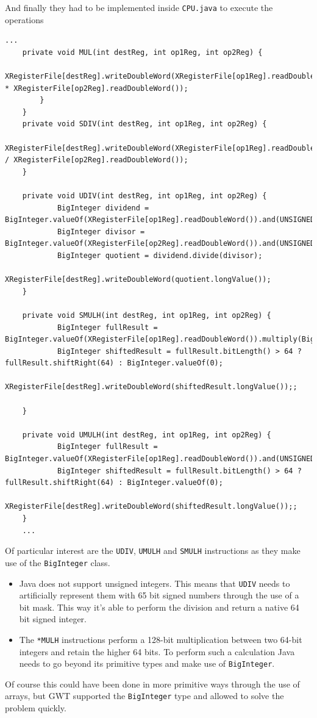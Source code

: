 And finally they had to be implemented inside \verb|CPU.java| to execute the operations
\begin{lstlisting}[caption={}]
	...
	private void MUL(int destReg, int op1Reg, int op2Reg) {											
			XRegisterFile[destReg].writeDoubleWord(XRegisterFile[op1Reg].readDoubleWord() * XRegisterFile[op2Reg].readDoubleWord());
		}
	}
	private void SDIV(int destReg, int op1Reg, int op2Reg) {
			XRegisterFile[destReg].writeDoubleWord(XRegisterFile[op1Reg].readDoubleWord() / XRegisterFile[op2Reg].readDoubleWord());
	}
	
	private void UDIV(int destReg, int op1Reg, int op2Reg) {
			BigInteger dividend = BigInteger.valueOf(XRegisterFile[op1Reg].readDoubleWord()).and(UNSIGNED_LONG_MASK);
			BigInteger divisor = BigInteger.valueOf(XRegisterFile[op2Reg].readDoubleWord()).and(UNSIGNED_LONG_MASK);
			BigInteger quotient = dividend.divide(divisor);
			XRegisterFile[destReg].writeDoubleWord(quotient.longValue());
	}
	
	private void SMULH(int destReg, int op1Reg, int op2Reg) {
			BigInteger fullResult = BigInteger.valueOf(XRegisterFile[op1Reg].readDoubleWord()).multiply(BigInteger.valueOf(XRegisterFile[op2Reg].readDoubleWord()));
			BigInteger shiftedResult = fullResult.bitLength() > 64 ? fullResult.shiftRight(64) : BigInteger.valueOf(0);
			XRegisterFile[destReg].writeDoubleWord(shiftedResult.longValue());;
			
	}
	
	private void UMULH(int destReg, int op1Reg, int op2Reg) {
			BigInteger fullResult = BigInteger.valueOf(XRegisterFile[op1Reg].readDoubleWord()).and(UNSIGNED_LONG_MASK).multiply(BigInteger.valueOf(XRegisterFile[op2Reg].readDoubleWord()).and(UNSIGNED_LONG_MASK));
			BigInteger shiftedResult = fullResult.bitLength() > 64 ? fullResult.shiftRight(64) : BigInteger.valueOf(0);
			XRegisterFile[destReg].writeDoubleWord(shiftedResult.longValue());;
	}
	...
\end{lstlisting}
Of particular interest are the \verb|UDIV|, \verb|UMULH| and \verb|SMULH| instructions as they make use of the \verb|BigInteger| class.
\begin{itemize}
\item Java does not support unsigned integers. This means that \verb|UDIV| needs to artificially represent them with 65 bit signed numbers through the use of a bit mask. This way it's able to perform the division and return a native 64 bit signed integer.
\item The \verb|*MULH| instructions perform a 128-bit multiplication between two 64-bit integers and retain the higher 64 bits. To perform such a calculation Java needs to go beyond its primitive types and make use of \verb|BigInteger|.
\end{itemize}
Of course this could have been done in more primitive ways through the use of arrays, but GWT supported the \verb|BigInteger| type and allowed to solve the problem quickly.


